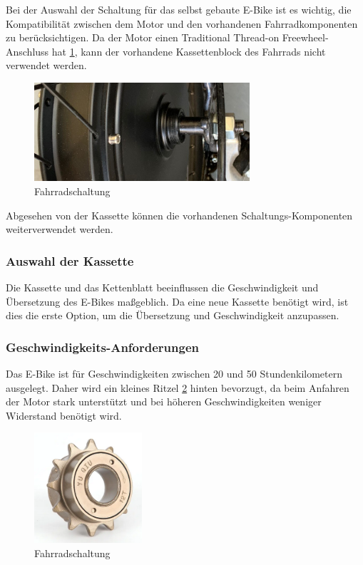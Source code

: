 Bei der Auswahl der Schaltung für das selbst gebaute E-Bike ist es wichtig, die Kompatibilität zwischen dem Motor und den vorhandenen Fahrradkomponenten zu berücksichtigen.
Da der Motor einen Traditional Thread-on Freewheel-Anschluss hat \ref{fig:25}, kann der vorhandene Kassettenblock des Fahrrads nicht verwendet werden.

\begin{figure}[h]
    \centering
    \includegraphics[width=8cm]{images/Radnabenmotoranschluss.jpg}
    \caption{Fahrradschaltung\cite{noauthor_schaltung_nodate}}
    \label{fig:25}
\end{figure}


Abgesehen von der Kassette können die vorhandenen Schaltungs-Komponenten weiterverwendet werden.

\subsubsection*{Auswahl der Kassette}
Die Kassette und das Kettenblatt beeinflussen die Geschwindigkeit und Übersetzung des E-Bikes maßgeblich.
Da eine neue Kassette benötigt wird, ist dies die erste Option, um die Übersetzung und Geschwindigkeit anzupassen.


\subsubsection*{Geschwindigkeits-Anforderungen}
Das E-Bike ist für Geschwindigkeiten zwischen 20 und 50 Stundenkilometern ausgelegt.
Daher wird ein kleines Ritzel \ref{fig:19} hinten bevorzugt, da beim Anfahren der Motor stark unterstützt und bei höheren Geschwindigkeiten weniger Widerstand benötigt wird.

\begin{figure}[h]
    \centering
    \includegraphics[width=4cm]{images/kleines Ritzel.png}
    \caption{Fahrradschaltung\cite{noauthor_423_nodate}}
    \label{fig:19}
\end{figure}

